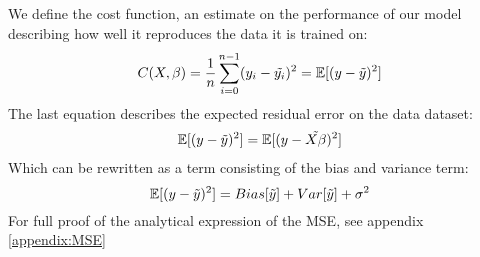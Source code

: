 
We define the cost function, an estimate on the performance of our model describing how well it reproduces the data it is trained on:\\
\begin{equation}
C(X,\beta)= \frac{1}{n}\sum_{i=0}^{n-1}(y_i-\Tilde{y_i})^2=\mathbb{E}[(y-\Tilde{y})^2]
\end{equation}
The last equation describes the expected residual error on the data dataset: 
\begin{align*}
    \mathbb{E}[(y-\Tilde{y})^2] = \mathbb{E}[(y-\Tilde{X\beta})^2]
\end{align*}
Which can be rewritten as a term consisting of the bias and variance term:
\begin{equation}
    \mathbb{E}[(y-\Tilde{y})^2] = Bias[\Tilde{y}]+Var[\Tilde{y}]+\sigma^2
\end{equation}
For full proof of the analytical expression of the MSE, see appendix \ref{appendix:MSE}


